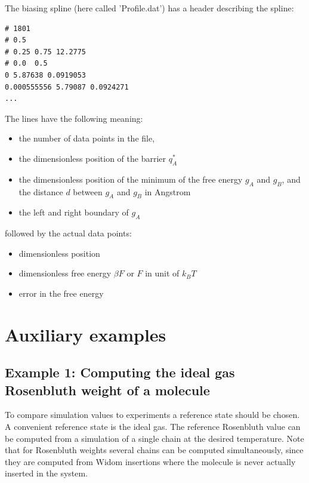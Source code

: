 The biasing spline (here called 'Profile.dat') has a header describing the spline:
\begin{tiny}
\begin{verbatim}
# 1801
# 0.5
# 0.25 0.75 12.2775
# 0.0  0.5
0 5.87638 0.0919053
0.000555556 5.79087 0.0924271
...
\end{verbatim}
\end{tiny}
The lines have the following meaning:
\begin{itemize}
\item{the number of data points in the file},
\item{the dimensionless position of the barrier $q^*_A$}
\item{the dimensionless position of the minimum of the free energy $g_A$ and $g_B$, and the distance $d$ between $g_A$ and $g_B$ in Angstrom}
\item{the left and right boundary of $g_A$}
\end{itemize}
followed by the actual data points: 
\begin{itemize}
\item{dimensionless position}
\item{dimensionless free energy $\beta F$ or $F$ in unit of $k_BT$}
\item{error in the free energy}
\end{itemize}


\section{Auxiliary examples}

\subsection*{Example 1: Computing the ideal gas Rosenbluth weight of a molecule}

To compare simulation values to experiments a reference state should be chosen. A convenient reference state
is the ideal gas. The reference Rosenbluth value can be computed from a simulation of a single chain at the
desired temperature. Note that for Rosenbluth weights several chains can be computed simultaneously, since
they are computed from Widom insertions where the molecule is never actually inserted in the system.

